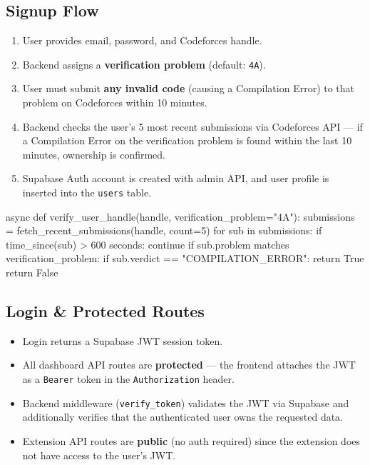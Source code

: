 \documentclass[11pt, a4paper]{article}
\begin{document}
\subsection{Signup Flow}

\begin{enumerate}
  \item User provides email, password, and Codeforces handle.
  \item Backend assigns a \textbf{verification problem} (default: \texttt{4A}).
  \item User must submit \textbf{any invalid code} (causing a Compilation Error) to
        that problem on Codeforces within 10 minutes.
  \item Backend checks the user's 5 most recent submissions via Codeforces API ---
        if a Compilation Error on the verification problem is found within the
        last 10 minutes, ownership is confirmed.
  \item Supabase Auth account is created with admin API, and user profile is
        inserted into the \texttt{users} table.
\end{enumerate}

\begin{codebox}
async def verify_user_handle(handle, verification_problem="4A"):
    submissions = fetch_recent_submissions(handle, count=5)
    for sub in submissions:
        if time_since(sub) > 600 seconds:
            continue
        if sub.problem matches verification_problem:
            if sub.verdict == "COMPILATION_ERROR":
                return True
    return False
\end{codebox}

\subsection{Login \& Protected Routes}

\begin{itemize}
  \item Login returns a Supabase JWT session token.
  \item All dashboard API routes are \textbf{protected} --- the frontend attaches
        the JWT as a \texttt{Bearer} token in the \texttt{Authorization} header.
  \item Backend middleware (\texttt{verify\_token}) validates the JWT via Supabase
        and additionally verifies that the authenticated user owns the requested data.
  \item Extension API routes are \textbf{public} (no auth required) since the
        extension does not have access to the user's JWT.
\end{itemize}
\end{document}
